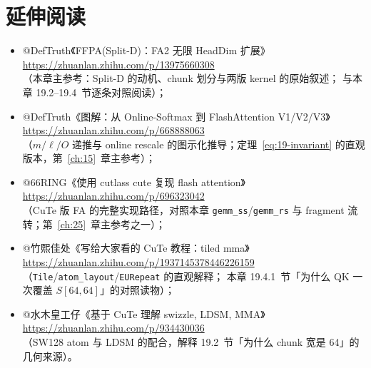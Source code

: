 \section*{延伸阅读}

\begin{itemize}
  \item @DefTruth《FFPA(Split-D)：FA2 无限 HeadDim 扩展》\\
        \url{https://zhuanlan.zhihu.com/p/13975660308}\\
        （本章主参考：Split-D 的动机、chunk 划分与两版 kernel 的原始叙述；
        与本章 19.2--19.4~节逐条对照阅读）；
  \item @DefTruth《图解：从 Online-Softmax 到 FlashAttention V1/V2/V3》\\
        \url{https://zhuanlan.zhihu.com/p/668888063}\\
        （$m/\ell/O$ 递推与 online rescale 的图示化推导；定理~\ref{eq:19-invariant}
        的直观版本，第~\ref{ch:15}~章主参考）；
  \item @66RING《使用 cutlass cute 复现 flash attention》\\
        \url{https://zhuanlan.zhihu.com/p/696323042}\\
        （CuTe 版 FA 的完整实现路径，对照本章 \texttt{gemm\_ss}/\texttt{gemm\_rs}
        与 fragment 流转；第~\ref{ch:25}~章主参考之一）；
  \item @竹熙佳处《写给大家看的 CuTe 教程：tiled mma》\\
        \url{https://zhuanlan.zhihu.com/p/1937145378446226159}\\
        （\texttt{Tile}/\texttt{atom\_layout}/\texttt{EURepeat} 的直观解释；
        本章 19.4.1~节「为什么 QK 一次覆盖 $S[64,64]$」的对照读物）；
  \item @水木皇工仔《基于 CuTe 理解 swizzle, LDSM, MMA》\\
        \url{https://zhuanlan.zhihu.com/p/934430036}\\
        （SW128 atom 与 LDSM 的配合，解释 19.2~节「为什么 chunk 宽是 64」的
        几何来源）。
\end{itemize}
